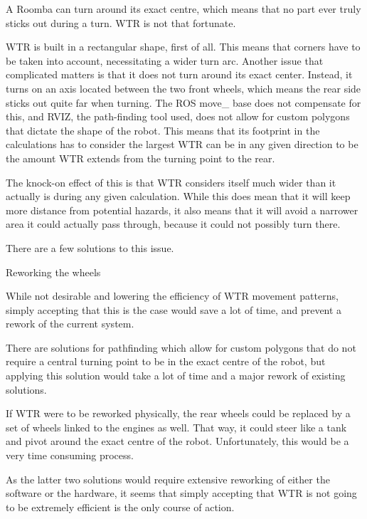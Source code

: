 A Roomba can turn around its exact centre, which means that no part ever truly sticks out during a turn.
WTR is not that fortunate.

WTR is built in a rectangular shape, first of all.
This means that corners have to be taken into account, necessitating a wider turn arc.
Another issue that complicated matters is that it does not turn around its exact center.
Instead, it turns on an axis located between the two front wheels, which means the rear side sticks out quite far when turning.
The ROS move\_ base does not compensate for this, and RVIZ, the path-finding tool used, does not allow for custom polygons that dictate the shape of the robot.
This means that its footprint in the calculations has to consider the largest WTR can be in any given direction to be the amount WTR extends from the turning point to the rear.

The knock-on effect of this is that WTR considers itself much wider than it actually is during any given calculation.
While this does mean that it will keep more distance from potential hazards, it also means that it will avoid a narrower area it could actually pass through, because it could not possibly turn there.

There are a few solutions to this issue.
\begin{labeling}{Reworking the wheels}
\item [Accepting it] While not desirable and lowering the efficiency of WTR movement patterns, simply accepting that this is the case would save a lot of time, and prevent a rework of the current system.
\item [Changing Software] There are solutions for pathfinding which allow for custom polygons that do not require a central turning point to be in the exact centre of the robot, but applying this solution would take a lot of time and a major rework of existing solutions.
\item [Reworking the wheels] If WTR were to be reworked physically, the rear wheels could be replaced by a set of wheels linked to the engines as well. That way, it could steer like a tank and pivot around the exact centre of the robot. Unfortunately, this would be a very time consuming process.
\end{labeling}

As the latter two solutions would require extensive reworking of either the software or the hardware, it seems that simply accepting that WTR is not going to be extremely efficient is the only course of action.

\newpage